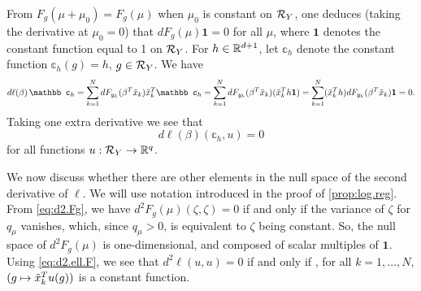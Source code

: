 \begin{remark}
From $F_g(\mu + \mu_0) = F_g(\mu)$ when $\mu_0$ is constant on ${\mathcal R}_Y$, one deduces (taking the derivative at $\mu_0 = 0$) that $dF_g(\mu) \boldsymbol 1 = 0$ for all $\mu$, where $\boldsymbol 1$ denotes the constant function equal to 1 on ${\mathcal R}_Y$. For $h\in {\mathbb{R}}^{d+1}$, let $\mathbb c_h$ denote the constant function $\mathbb c_h(g) = h$, $g\in {\mathcal R}_Y$. We have
\[
d\ell(\beta)\,  \mathbb c_h  =  \sum_{k=1}^N dF_{y_k}(\beta^T\tx_k)\tx_k^T\mathbb c_h =  \sum_{k=1}^N dF_{y_k}(\beta^T\tx_k)(\tx_k^Th \boldsymbol 1) = \sum_{k=1}^N (\tx_k^Th) dF_{y_k}(\beta^T\tx_k) \boldsymbol 1  = 0.
\]
Taking one extra derivative we see that 
\[
d\ell(\beta) (\mathbb c_h , u) = 0
\]
for all functions $u: {\mathcal R}_Y \to {\mathbb{R}}^q$.
\end{remark}

We now discuss whether there are other elements in the null space of the second derivative of $\ell$. We will use notation introduced in the proof of \cref{prop:log.reg}.  From \cref{eq:d2.Fg}, we have $d^2F_g(\mu)(\zeta, \zeta) = 0$ if and only if the variance of $\zeta$ for $q_\mu$ vanishes, which, since $q_\mu >0$, is equivalent to $\zeta$ being constant. So, the null space of $d^2F_g(\mu)$ is one-dimensional, and composed of scalar multiples of $\boldsymbol 1$. Using \cref{eq:d2.ell.F}, we see that $d^2\ell(u,u) = 0$ if and only if , for all $k=1, \ldots, N$, $(g\mapsto {\tilde{x}}_{k}^{T} u(g))$ is a constant function.
 
